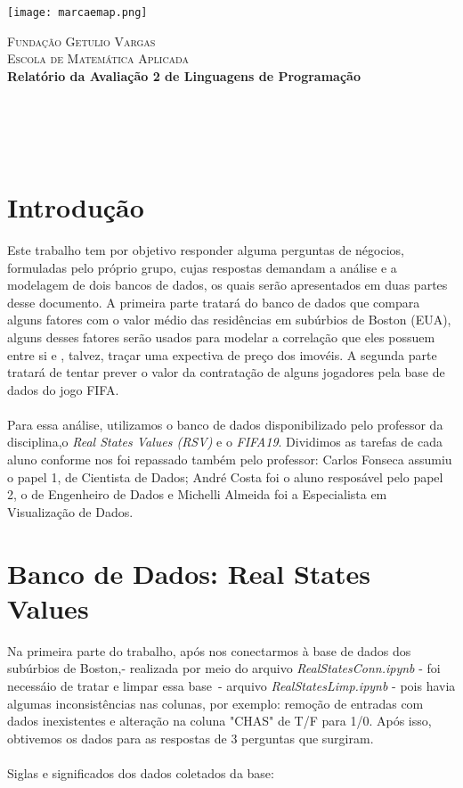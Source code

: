 \documentclass[12pt]{article}
\begin{document}
\newcommand{\HRule}{\rule{\linewidth}{0.3mm}}

\begin{center}
\texttt{[image: marcaemap.png]}

\textsc{\large Fundação Getulio Vargas}\\
\textsc{\small Escola de Matemática Aplicada}\\[0.5 cm]
\LARGE{\textbf{ Relatório da Avaliação 2 de Linguagens de Programação}}\\[0.5 cm]


\\
\\
\\
\text{\large \today}\\[1.5 cm]
\end{center}

\section{Introdução}
Este trabalho tem por objetivo responder alguma perguntas de négocios, formuladas pelo próprio grupo, cujas respostas demandam a análise e a modelagem de dois bancos de dados, os quais serão apresentados em duas partes desse documento. A primeira parte tratará do banco de dados que compara alguns fatores com o valor médio das residências em subúrbios de Boston (EUA), alguns desses fatores serão usados para modelar a correlação que eles possuem entre si e , talvez, traçar uma expectiva de preço dos imovéis. A segunda parte tratará de tentar prever o valor da contratação de alguns jogadores pela base de dados do jogo FIFA. 
\\
\\
Para essa análise, utilizamos o banco de dados disponibilizado pelo professor da disciplina,o \emph{Real States Values (RSV)} e o \emph{FIFA19}. Dividimos as tarefas de cada aluno conforme nos foi repassado também pelo professor: Carlos Fonseca assumiu o papel 1, de Cientista de Dados; André Costa foi o aluno resposável pelo papel 2, o de Engenheiro de Dados e Michelli Almeida foi a Especialista em Visualização de Dados.

\section{Banco de Dados: Real States Values}
Na primeira parte do trabalho, após nos conectarmos à base de dados dos subúrbios de Boston,- realizada por meio do arquivo \emph{RealStatesConn.ipynb} -  foi necessáio de tratar e limpar essa base\ - arquivo \emph{RealStatesLimp.ipynb} - pois havia algumas inconsistências nas colunas, por exemplo: remoção de entradas com dados inexistentes e alteração na coluna "CHAS" de T/F para 1/0. Após isso, obtivemos os dados para as respostas de 3 perguntas que surgiram.
\\
\\
Siglas e significados dos dados coletados da base:
\end{document}

